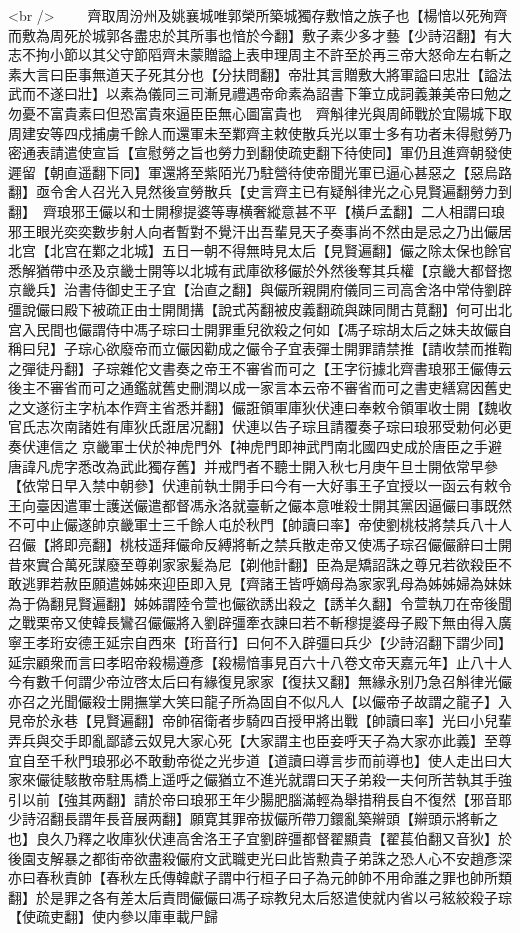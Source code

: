 <br />
　　齊取周汾州及姚襄城唯郭榮所築城獨存敷愔之族子也【楊愔以死殉齊而敷為周死於城郭各盡忠於其所事也愔於今翻】敷子素少多才藝【少詩沼翻】有大志不拘小節以其父守節䧟齊未蒙贈謚上表申理周主不許至於再三帝大怒命左右斬之素大言曰臣事無道天子死其分也【分扶問翻】帝壯其言贈敷大將軍謚曰忠壯【謚法武而不遂曰壯】以素為儀同三司漸見禮遇帝命素為詔書下筆立成詞義兼美帝曰勉之勿憂不富貴素曰但恐富貴來逼臣臣無心圖富貴也　齊斛律光與周師戰於宜陽城下取周建安等四戍捕虜千餘人而還軍未至鄴齊主敕使散兵光以軍士多有功者未得慰勞乃密通表請遣使宣旨【宣慰勞之旨也勞力到翻使疏吏翻下待使同】軍仍且進齊朝發使遲留【朝直遥翻下同】軍還將至紫陌光乃駐營待使帝聞光軍已逼心甚惡之【惡烏路翻】亟令舍人召光入見然後宣勞散兵【史言齊主已有疑斛律光之心見賢遍翻勞力到翻】　齊琅邪王儼以和士開穆提婆等專横奢縱意甚不平【横戶孟翻】二人相謂曰琅邪王眼光奕奕數步射人向者暫對不覺汗出吾輩見天子奏事尚不然由是忌之乃出儼居北宫【北宫在鄴之北城】五日一朝不得無時見太后【見賢遍翻】儼之除太保也餘官悉解猶帶中丞及京畿士開等以北城有武庫欲移儼於外然後奪其兵權【京畿大都督揔京畿兵】治書侍御史王子宜【治直之翻】與儼所親開府儀同三司高舍洛中常侍劉辟彊說儼曰殿下被疏正由士開閒搆【說式芮翻被皮義翻疏與踈同閒古莧翻】何可出北宫入民間也儼謂侍中馮子琮曰士開罪重兒欲殺之何如【馮子琮胡太后之妹夫故儼自稱曰兒】子琮心欲廢帝而立儼因勸成之儼令子宜表彈士開罪請禁推【請收禁而推鞫之彈徒丹翻】子琮雜佗文書奏之帝王不審省而可之【王字衍據北齊書琅邪王儼傳云後主不審省而可之通鑑就舊史刪潤以成一家言本云帝不審省而可之書吏繕寫因舊史之文遂衍主字杭本作齊主省悉并翻】儼誑領軍庫狄伏連曰奉敕令領軍收士開【魏收官氏志次南諸姓有庫狄氏誑居况翻】伏連以告子琮且請覆奏子琮曰琅邪受勅何必更奏伏連信之京畿軍士伏於神虎門外【神虎門即神武門南北國四史成於唐臣之手避唐諱凡虎字悉改為武此獨存舊】并戒門者不聽士開入秋七月庚午旦士開依常早參【依常日早入禁中朝參】伏連前執士開手曰今有一大好事王子宜授以一函云有敕令王向臺因遣軍士護送儼遣都督馮永洛就臺斬之儼本意唯殺士開其黨因逼儼曰事既然不可中止儼遂帥京畿軍士三千餘人屯於秋門【帥讀曰率】帝使劉桃枝將禁兵八十人召儼【將即亮翻】桃枝遥拜儼命反縛將斬之禁兵散走帝又使馮子琮召儼儼辭曰士開昔來實合萬死謀廢至尊剃家家髪為尼【剃他計翻】臣為是矯詔誅之尊兄若欲殺臣不敢逃罪若赦臣願遣姊姊來迎臣即入見【齊諸王皆呼嫡母為家家乳母為姊姊婦為妹妹為于偽翻見賢遍翻】姊姊謂陸令萱也儼欲誘出殺之【誘羊久翻】令萱執刀在帝後聞之戰栗帝又使韓長鸞召儼儼將入劉辟彊牽衣諫曰若不斬穆提婆母子殿下無由得入廣寧王孝珩安德王延宗自西來【珩音行】曰何不入辟彊曰兵少【少詩沼翻下謂少同】延宗顧衆而言曰孝昭帝殺楊遵彥【殺楊愔事見百六十八卷文帝天嘉元年】止八十人今有數千何謂少帝泣啓太后曰有緣復見家家【復扶又翻】無緣永别乃急召斛律光儼亦召之光聞儼殺士開撫掌大笑曰龍子所為固自不似凡人【以儼帝子故謂之龍子】入見帝於永巷【見賢遍翻】帝帥宿衛者步騎四百授甲將出戰【帥讀曰率】光曰小兒輩弄兵與交手即亂鄙諺云奴見大家心死【大家謂主也臣妾呼天子為大家亦此義】至尊宜自至千秋門琅邪必不敢動帝從之光步道【道讀曰導言步而前導也】使人走出曰大家來儼徒駭散帝駐馬橋上遥呼之儼猶立不進光就謂曰天子弟殺一夫何所苦執其手強引以前【強其两翻】請於帝曰琅邪王年少腸肥腦滿輕為舉措稍長自不復然【邪音耶少詩沼翻長謂年長音展两翻】願寛其罪帝拔儼所帶刀鐶亂築辮頭【辮頭示將斬之也】良久乃釋之收庫狄伏連高舍洛王子宜劉辟彊都督翟顯貴【翟萇伯翻又音狄】於後園支解暴之都街帝欲盡殺儼府文武職吏光曰此皆勲貴子弟誅之恐人心不安趙彥深亦曰春秋責帥【春秋左氏傳韓獻子謂中行桓子曰子為元帥帥不用命誰之罪也帥所類翻】於是罪之各有差太后責問儼儼曰馮子琮教兒太后怒遣使就内省以弓絃絞殺子琮【使疏吏翻】使内參以庫車載尸歸